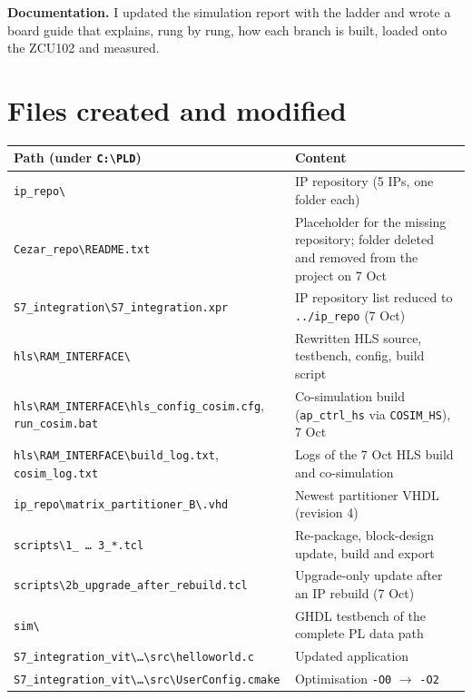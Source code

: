 \documentclass[11pt,a4paper]{article}
\newcommand{\code}[1]{\texttt{#1}}
\begin{document}
\textbf{Documentation.} I updated the simulation report with the ladder and wrote a board guide that explains, rung by rung, how each branch is built, loaded onto the ZCU102 and measured.

\section{Files created and modified}
\begin{longtable}{@{}p{}p{}@{}}
\toprule
\textbf{Path (under \code{C:\textbackslash PLD})} & \textbf{Content} \\
\midrule
\endhead
\code{ip\_repo\textbackslash *} & IP repository (5 IPs, one folder each) \\
\code{Cezar\_repo\textbackslash README.txt} & Placeholder for the missing repository; folder deleted and removed from the project on 7 Oct \\
\code{S7\_integration\textbackslash S7\_integration.xpr} & IP repository list reduced to \code{../ip\_repo} (7 Oct) \\
\code{hls\textbackslash RAM\_INTERFACE\textbackslash *} & Rewritten HLS source, testbench, config, build script \\
\code{hls\textbackslash RAM\_INTERFACE\textbackslash}\allowbreak\code{hls\_config\_cosim.cfg}, \code{run\_cosim.bat} & Co-simulation build (\code{ap\_ctrl\_hs} via \code{COSIM\_HS}), 7 Oct \\
\code{hls\textbackslash RAM\_INTERFACE\textbackslash}\allowbreak\code{build\_log.txt}, \code{cosim\_log.txt} & Logs of the 7 Oct HLS build and co-simulation \\
\code{ip\_repo\textbackslash matrix\_partitioner\_B\textbackslash *.vhd} & Newest partitioner VHDL (revision 4) \\
\code{scripts\textbackslash 1\_ \ldots\ 3\_*.tcl} & Re-package, block-design update, build and export \\
\code{scripts\textbackslash 2b\_upgrade\_after\_rebuild.tcl} & Upgrade-only update after an IP rebuild (7 Oct) \\
\code{sim\textbackslash *} & GHDL testbench of the complete PL data path \\
\code{S7\_integration\_vit\textbackslash}\allowbreak\code{\ldots\textbackslash src\textbackslash helloworld.c} & Updated application \\
\code{S7\_integration\_vit\textbackslash}\allowbreak\code{\ldots\textbackslash src\textbackslash UserConfig.cmake} & Optimisation \code{-O0} $\rightarrow$ \code{-O2} \\

\end{longtable}
\end{document}
